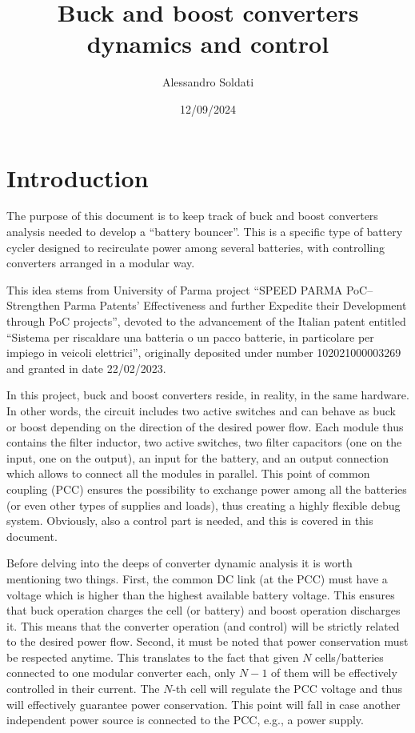 \documentclass{article}
\title{Buck and boost converters dynamics and control}
\author{Alessandro Soldati}
\date{12/09/2024}
\begin{document}
\maketitle
\tableofcontents

\section{Introduction}

The purpose of this document is to keep track of buck and boost converters analysis needed to develop a ``battery bouncer''. This is a specific type of battery cycler designed to recirculate power among several batteries, with controlling converters arranged in a modular way.

This idea stems from University of Parma project ``SPEED PARMA PoC--Strengthen Parma Patents' Effectiveness and further Expedite their Development through PoC projects'', devoted to the advancement of the Italian patent entitled ``Sistema per riscaldare una batteria o un pacco batterie, in particolare per impiego in veicoli elettrici'', originally deposited under number 102021000003269 and granted in date 22/02/2023.

In this project, buck and boost converters reside, in reality, in the same hardware. In other words, the circuit includes two active switches and can behave as buck or boost depending on the direction of the desired power flow. Each module thus contains the filter inductor, two active switches, two filter capacitors (one on the input, one on the output), an input for the battery, and an output connection which allows to connect all the modules in parallel. This point of common coupling (PCC) ensures the possibility to exchange power among all the batteries (or even other types of supplies and loads), thus creating a highly flexible debug system. Obviously, also a control part is needed, and this is covered in this document.

Before delving into the deeps of converter dynamic analysis it is worth mentioning two things.
First, the common DC link (at the PCC) must have a voltage which is higher than the highest available battery voltage. This ensures that buck operation charges the cell (or battery) and boost operation discharges it. This means that the converter operation (and control) will be strictly related to the desired power flow.
Second, it must be noted that power conservation must be respected anytime. This translates to the fact that given $N$ cells/batteries connected to one modular converter each, only $N-1$ of them will be effectively controlled in their current. The $N$-th cell will regulate the PCC voltage and thus will effectively guarantee power conservation. This point will fall in case another independent power source is connected to the PCC, e.g., a power supply.
\end{document}
